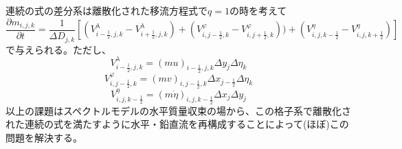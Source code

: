 \documentclass{jsbook}
\begin{document}
連続の式の差分系は離散化された移流方程式で$q=1$の時を考えて
\begin{equation}
  \frac{\partial m_{i,j,k} }{\partial t}=\frac{1}{\Delta D_{j,k}}[(V^{\lambda}_{i-\frac{1}{2},j,k}-V^{\lambda}_{i+\frac{1}{2},j,k})+(V^{\varphi}_{i,j-\frac{1}{2},k}-V^{\varphi}_{i,j+\frac{1}{2},k}))+(V^{\eta}_{i,j,k-\frac{1}{2}}-V^{\eta}_{i,j,k+\frac{1}{2}})]
\end{equation}
で与えられる。ただし、
\begin{equation}
  V^{\lambda}_{i-\frac{1}{2},j,k}=(mu)_{i-\frac{1}{2},j,k} \Delta y_{j} \Delta \eta_{k}
\end{equation}
\begin{equation}
  V^{\varphi}_{i,j-\frac{1}{2},k}=(mv)_{i,j-\frac{1}{2},k} \Delta x_{j-\frac{1}{2}} \Delta \eta_{k}
\end{equation}
\begin{equation}
  V^{\eta}_{i,j,k-\frac{1}{2}}=(m\dot{\eta})_{i,j,k-\frac{1}{2}} \Delta x_{j} \Delta y_{j}
\end{equation}
以上の課題はスペクトルモデルの水平質量収束の場から、この格子系で離散化された連続の式を満たすように水平・鉛直流を再構成することによって(ほぼ)この問題を解決する。
\end{document}
